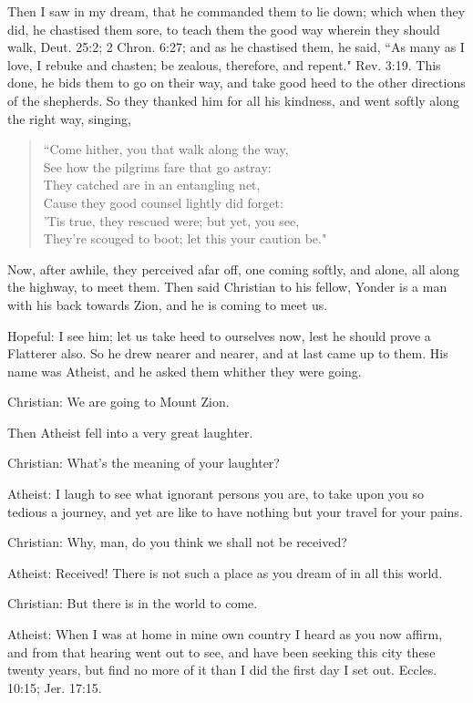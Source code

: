 Then I saw in my dream, that he commanded them to lie down; which when they did, he chastised them sore, to teach them the good way wherein they should walk, Deut. 25:2; 2 Chron. 6:27; and as he chastised them, he said, ``As many as I love, I rebuke and chasten; be zealous, therefore, and repent." Rev. 3:19. This done, he bids them to go on their way, and take good heed to the other directions of the shepherds. So they thanked him for all his kindness, and went softly along the right way, singing,
\begin{verse}
``Come hither, you that walk along the way,\\
See how the pilgrims fare that go astray:\\
They catched are in an entangling net,\\
Cause they good counsel lightly did forget:\\
'Tis true, they rescued were; but yet, you see,\\
They're scouged to boot; let this your caution be."\\
\end{verse}
Now, after awhile, they perceived afar off, one coming softly, and alone, all along the highway, to meet them. Then said Christian to his fellow, Yonder is a man with his back towards Zion, and he is coming to meet us.

Hopeful: I see him; let us take heed to ourselves now, lest he should prove a Flatterer also. So he drew nearer and nearer, and at last came up to them. His name was Atheist, and he asked them whither they were going.

Christian: We are going to Mount Zion.

Then Atheist fell into a very great laughter.

Christian: What's the meaning of your laughter?

Atheist: I laugh to see what ignorant persons you are, to take upon you so tedious a journey, and yet are like to have nothing but your travel for your pains.

Christian: Why, man, do you think we shall not be received?

Atheist: Received! There is not such a place as you dream of in all this world.

Christian: But there is in the world to come.

Atheist: When I was at home in mine own country I heard as you now affirm, and from that hearing went out to see, and have been seeking this city these twenty years, but find no more of it than I did the first day I set out. Eccles. 10:15; Jer. 17:15.

